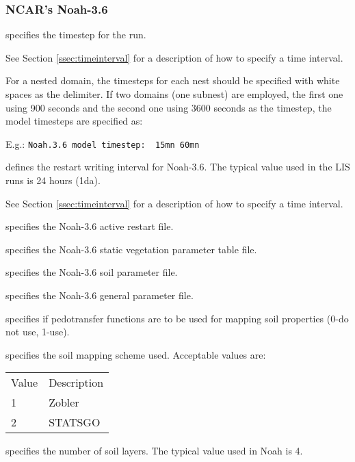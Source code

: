  
 \subsubsection{NCAR's Noah-3.6} \label{sssec:lsm_noah36}
 

 
  specifies the timestep for the run.

 See Section \ref{ssec:timeinterval} for a description
 of how to specify a time interval.

 For a nested domain, the timesteps for each nest should be specified
 with white spaces as the delimiter. If two domains (one subnest) are
 employed, the first one using 900 seconds and the second one using
 3600 seconds as the timestep, the model timesteps are specified as:

 E.g.: \quad \verb+Noah.3.6 model timestep:  15mn 60mn+

  defines the restart
 writing interval for Noah-3.6. The typical value used in the
 LIS runs is 24 hours (1da).

 See Section \ref{ssec:timeinterval} for a description
 of how to specify a time interval.

  specifies the Noah-3.6 active
 restart file.

  specifies the
 Noah-3.6 static vegetation parameter table file.

  specifies the
 Noah-3.6 soil parameter file.

  specifies the
 Noah-3.6 general parameter file.

  specifies if
 pedotransfer functions are to be used for mapping soil properties
 (0-do not use, 1-use).

  specifies the soil mapping scheme used.
 Acceptable values are:

 \begin{tabular}{ll}
 Value & Description \\
 1     & Zobler      \\
 2     & STATSGO     \\
 \end{tabular}

  specifies the number of
 soil layers. The typical value used in Noah is 4.

